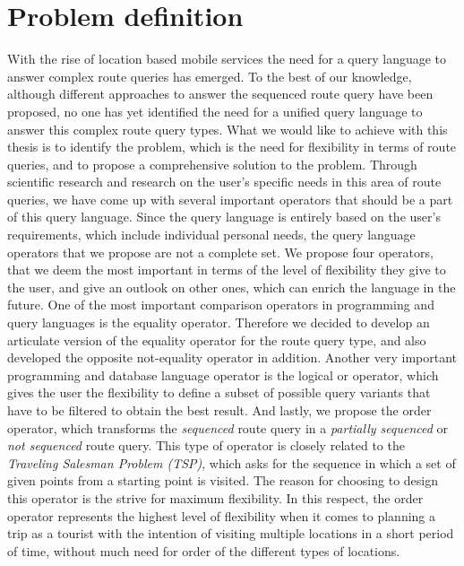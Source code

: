 \section{Problem definition}

With the rise of location based mobile services the need for a query language to answer complex route queries has emerged. To the best of our knowledge, although different approaches to answer the sequenced route query have been proposed, no one has yet identified the need for a unified query language to answer this complex route query types. What we would like to achieve with this thesis is to identify the problem, which is the need for flexibility in terms of route queries, and to propose a comprehensive solution to the problem. Through scientific research and research on the user's specific needs in this area of route queries, we have come up with several important operators that should be a part of this query language. Since the query language is entirely based on the user's requirements, which include individual personal needs, the query language operators that we propose are not a complete set. We propose four operators, that we deem the most important in terms of the level of flexibility they give to the user, and give an outlook on other ones, which can enrich the language in the future. \newline
One of the most important comparison operators in programming and query languages is the equality operator. Therefore we decided to develop an articulate version of the equality operator for the route query type, and also developed the opposite not-equality operator in addition. Another very important programming and database language operator is the logical or operator, which gives the user the flexibility to define a subset of possible query variants that have to be filtered to obtain the best result. And lastly, we propose the order operator, which transforms the \textit{sequenced} route query in a \textit{partially sequenced} or \textit{not sequenced} route query. This type of operator is closely related to the \textit{Traveling Salesman Problem (TSP)}, which asks for the sequence in which a set of given points from a starting point is visited. The reason for choosing to design this operator is the strive for maximum flexibility. In this respect, the order operator represents the highest level of flexibility when it comes to planning a trip as a tourist with the intention of visiting multiple locations in a short period of time, without much need for order of the different types of locations.

